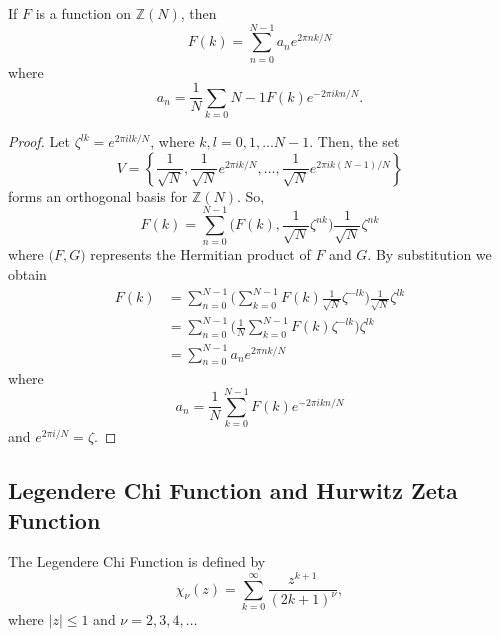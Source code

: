 \documentclass[../article.tex]{subfiles}
\begin{document}
\begin{theorem}
If $F$ is a function on $\mathbb{Z}(N)$, then
\begin{equation}
F(k) = \sum_{n=0}^{N-1} a_n e^{2 \pi nk/N}
\end{equation}
where
\begin{equation}
a_n = \frac{1}{N} \sum_{k=0}{N-1} F(k) e^{-2 \pi ikn/N}.
\end{equation}
\end{theorem}
\begin{proof}
Let $\zeta^{lk} = e^{2 \pi i lk/N}$, where $k,l = 0,1,...N-1$. Then, the set
\begin{equation}
V = \left\{ \frac{1}{\sqrt{N}}, \frac{1}{\sqrt{N}}e^{2 \pi i k/N}, \ldots, \frac{1}{\sqrt{N}}e^{2 \pi i k(N-1)/N} \right\}
\end{equation}
forms an orthogonal basis for $\mathbb{Z}(N)$. So,
\begin{equation}
F(k) = \sum_{n=0}^{N-1} \Big(F(k), \frac{1}{\sqrt{N}}\zeta^{nk} \Big) \frac{1}{\sqrt{N}}\zeta^{nk}
\end{equation}
where $\big(F,G \big)$ represents the Hermitian product of $F$ and $G$. By substitution we obtain
\begin{equation}
\begin{split}
F(k) &= \sum_{n=0}^{N-1} \Bigg(\sum_{k=0}^{N-1} F(k) \frac{1}{\sqrt{N}} \zeta^{-lk} \Bigg) \frac{1}{\sqrt{N}} \zeta^{lk} \\
&= \sum_{n=0}^{N-1} \Bigg(\frac{1}{N} \sum_{k=0}^{N-1} F(k) \zeta^{-lk} \Bigg) \zeta^{lk} \\
&= \sum_{n=0}^{N-1} a_n e^{2 \pi nk/N}
\end{split}
\end{equation}
where
\begin{equation}
a_n = \frac{1}{N} \sum_{k=0}^{N-1} F(k) e^{-2 \pi ikn/N}
\end{equation}
and $e^{2 \pi i/N} = \zeta$.
\end{proof}

\subsection{Legendere Chi Function and Hurwitz Zeta Function}
\begin{definition}
The Legendere Chi Function is defined by
\begin{equation}
\chi_{\nu}(z) = \sum_{k=0}^{\infty} \frac{z^{k+1}}{(2k+1)^{\nu}},
\end{equation}
where $|z| \leq 1$ and $\nu = 2,3,4,\ldots$
\end{definition}
\end{document}
